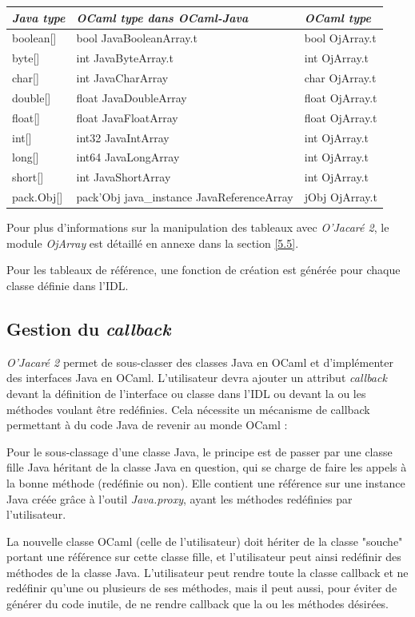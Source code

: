\documentclass[a4paper, 11pt]{article}
\begin{document}
\begin{tabular}{|l|l|l|}
  \hline
  \emph{Java type} & \emph{OCaml type dans OCaml-Java} & \emph{OCaml type}\\ 
  \hline
  boolean[] & bool JavaBooleanArray.t & bool OjArray.t \\
  byte[] & int JavaByteArray.t & int OjArray.t \\
  char[] & int JavaCharArray   & char OjArray.t \\
  double[] & float JavaDoubleArray & float OjArray.t \\
  float[] & float JavaFloatArray & float OjArray.t \\
  int[] & int32 JavaIntArray & int OjArray.t \\
  long[] & int64 JavaLongArray & int OjArray.t \\
  short[] & int JavaShortArray & int OjArray.t \\
  pack.Obj[] & pack'Obj java\_instance JavaReferenceArray & jObj OjArray.t \\
  \hline
\end{tabular}
\newline

Pour plus d'informations sur la manipulation des tableaux avec \emph{O'Jacaré 2}, le module \emph{OjArray} est détaillé en annexe dans la section \ref{5.5}.

Pour les tableaux de référence, une fonction de création est générée pour chaque classe définie dans l'IDL.

\subsection{Gestion du \emph{callback}}
\emph{O'Jacaré 2} permet de sous-classer des classes Java en OCaml et d'implémenter des interfaces Java en OCaml. 
L'utilisateur devra ajouter un attribut \emph{callback} devant la définition de l'interface ou classe dans l'IDL ou devant la ou les méthodes voulant être redéfinies.
Cela nécessite un mécanisme de callback permettant à du code Java de revenir au monde OCaml :

Pour le sous-classage d'une classe Java, le principe est de passer par une classe fille Java héritant de la classe Java en question, qui se charge de faire les appels à la bonne méthode (redéfinie ou non).
Elle contient une référence sur une instance Java créée grâce à l'outil \emph{Java.proxy}, ayant les méthodes redéfinies par l'utilisateur.

La nouvelle classe OCaml (celle de l'utilisateur) doit hériter de la classe "souche" portant une référence sur cette classe fille, et l'utilisateur peut ainsi redéfinir des méthodes de la classe Java.
L'utilisateur peut rendre toute la classe callback et ne redéfinir qu'une ou plusieurs de ses méthodes, mais il peut aussi, pour éviter de générer du code inutile, de ne rendre callback que la ou les méthodes désirées.
\end{document}
